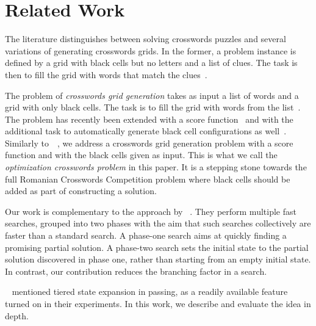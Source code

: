 \section{Related Work}
\label{sec::relwork}

The literature distinguishes between solving crosswords puzzles
and several variations of generating crosswords grids.
In the former, a problem instance is defined by a grid with black cells but no letters
and a list of clues.
The task is then to fill the grid with words that match the 
clues~\cite{DBLP:journals/ai/LittmanKS02,DBLP:conf/aaai/ErnandesAG05,DBLP:journals/jair/Ginsberg11,Chen-icaps22}.

The problem of \emph{crosswords grid generation} takes as input
a list of words and
a grid with only black cells.
The task is to fill the grid with words from the
list~\cite{MAZLACK19761,10.5555/1865499.1865531,botea-modref07,anbulagan-botea-cp08}.
The problem has recently been extended with a score function~\cite{DBLP:conf/socs/BoteaB21}
and with the additional task to automatically generate black cell configurations as well~\cite{DBLP:conf/cig/BulitkoB21}.
%
Similarly to~\citeauthor{DBLP:conf/socs/BoteaB21}~,
we address a crosswords grid generation problem
with a score function and with the black cells given as input.
This is what we call the {\em optimization crosswords problem} in this paper.
It is a stepping stone towards the full Romanian Crosswords Competition problem
where black cells should be added as part of constructing a solution.

Our work is complementary
to the approach by \citeauthor{DBLP:conf/socs/BoteaB21}~.
They perform multiple fast searches, grouped into two phases with the aim that
such searches collectively are faster than a standard search.
A phase-one search aims at
quickly finding a promising partial solution.
A phase-two search sets the initial state to the partial solution discovered in phase one,
rather than starting from an empty initial state.
In contrast, our contribution reduces the branching factor in a search.

\citeauthor{DBLP:conf/socs/BoteaB21}~ mentioned 
tiered state expansion in passing, as a readily available feature turned on in their
experiments. In this work, we describe and evaluate the idea in depth.


